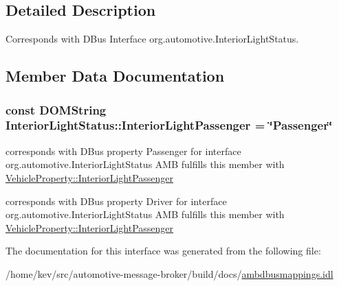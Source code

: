 \subsection{Detailed Description}
Corresponds with D\+Bus Interface org.\+automotive.\+Interior\+Light\+Status. 

\subsection{Member Data Documentation}
\hypertarget{interfaceInteriorLightStatus_abf8320eb6b0e7c6b60bbc90d91760832}{
\subsubsection[{Interior\+Light\+Passenger}]{\setlength{\rightskip}{0pt plus 5cm}const D\+O\+M\+String Interior\+Light\+Status\+::\+Interior\+Light\+Passenger = \char`\"{}Passenger\char`\"{}}}\label{interfaceInteriorLightStatus_abf8320eb6b0e7c6b60bbc90d91760832}


corresponds with D\+Bus property Passenger for interface org.\+automotive.\+Interior\+Light\+Status A\+M\+B fulfills this member with \hyperlink{classVehicleProperty_af60682429c3b2c7517715801d4ac0f92}{Vehicle\+Property\+::\+Interior\+Light\+Passenger} 

corresponds with D\+Bus property Driver for interface org.\+automotive.\+Interior\+Light\+Status A\+M\+B fulfills this member with \hyperlink{classVehicleProperty_af60682429c3b2c7517715801d4ac0f92}{Vehicle\+Property\+::\+Interior\+Light\+Passenger} 

The documentation for this interface was generated from the following file\+:\begin{DoxyCompactItemize}
\item 
/home/kev/src/automotive-\/message-\/broker/build/docs/\hyperlink{ambdbusmappings_8idl}{ambdbusmappings.\+idl}\end{DoxyCompactItemize}
